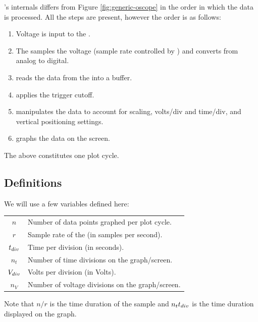 \documentclass[12pt,reqno]{amsart}
\begin{document}
\progname{}'s internals differs from Figure \ref{fig:generic-oscope} in the order in which the data is processed. All the steps are present, however the order is as follows:

\begin{enumerate}
\item Voltage is input to the \device{}.
\item The \device{} samples the voltage (sample rate controlled by \progname{}) and converts from analog to digital.
\item \progname{} reads the data from the \device{} into a buffer.
\item \progname{} applies the trigger cutoff.
\item \progname{} manipulates the data to account for scaling, volts/div and time/div, and vertical positioning settings.
\item \progname{} graphs the data on the screen.
\end{enumerate}

The above constitutes one plot cycle.

\subsection{Definitions}
We will use a few variables defined here:

\begin{center}
  \begin{tabular}[H]{c l}
    $n$ & Number of data points graphed per plot cycle. \\
    $r$ & Sample rate of the \device{} (in samples per second). \\
    $t_{div}$ & Time per division (in seconds). \\
    $n_t$ & Number of time divisions on the graph/screen. \\
    $V_{div}$ & Volts per division (in Volts). \\
    $n_V$ & Number of voltage divisions on the graph/screen.
  \end{tabular}
\end{center}

Note that $n/r$ is the time duration of the sample and $n_tt_{div}$ is the time duration displayed on the graph.
\end{document}
